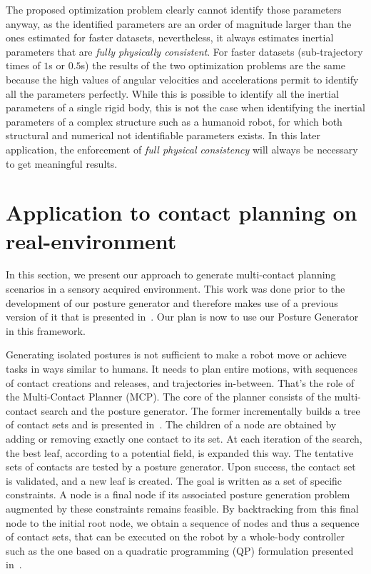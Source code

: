 \FloatBarrier
The proposed optimization problem clearly cannot identify those parameters anyway, as the identified parameters are an order of magnitude larger than the ones estimated for faster datasets, nevertheless, it always estimates inertial parameters that are \emph{fully physically consistent}.
For faster datasets (sub-trajectory times of $1$s or $0.5$s) the results of the two optimization problems are the same because the high values of angular velocities and accelerations permit to identify all the parameters perfectly.
While this is possible to identify all the inertial parameters of a single rigid body, this is not the case when identifying the inertial parameters of a complex structure such as a humanoid robot, for which both structural \cite{ayusawa2014identifiability} and numerical \cite{pham1991essential} not identifiable parameters exists.
In this later application, the enforcement of \emph{full physical consistency}  will always be necessary to get meaningful results.

\section{Application to contact planning on real-environment}
\label{sec:application_of_contact_planning_on_real_environment}

In this section, we present our approach to generate multi-contact planning scenarios in a sensory acquired environment.
This work was done prior to the development of our posture generator and therefore makes use of a previous version of it that is presented in~\cite{bouyarmane:humanoids:2010}.
Our plan is now to use our Posture Generator in this framework.

Generating isolated postures is not sufficient to make a robot move or achieve tasks in ways similar to humans.
It needs to plan entire motions, with sequences of contact creations and releases, and trajectories in-between.
That's the role of the Multi-Contact Planner (MCP).
The core of the planner consists of the multi-contact search and the posture generator.
The former incrementally builds a tree of contact sets and is presented in~\cite{escande:ras:2013}.
The children of a node are obtained by adding or removing exactly one contact to its set.
At each iteration of the search, the best leaf, according to a potential field, is expanded this way.
The tentative sets of contacts are tested by a posture generator.
Upon success, the contact set is validated, and a new leaf is created.
The goal is written as a set of specific constraints.
A node is a final node if its associated posture generation problem augmented by these constraints remains feasible.
By backtracking from this final node to the initial root node, we obtain a sequence of nodes and thus a sequence of contact sets, that can be executed on the robot by a whole-body controller such as the one based on a quadratic programming (QP) formulation presented in~\cite{bouyarmane:iros:2011}.

